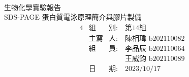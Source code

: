 


\pagestyle{empty}

\begin{center}
~\\
\vspace{2.7cm}
{\fontsize{36}{120}\selectfont 生物化學實驗報告}\\
\vspace{2.2cm}
{\fontsize{36}{80}\selectfont SDS-PAGE 蛋白質電泳原理簡介與膠片製備}
\vspace{2cm}
{\fontsize{18}{20}\selectfont 
  \begin{alignat*}{4}
    &\text{組}&\text{別}:\ &\text{第14組}\\
    &\text{主寫}&\text{人}:\ &\text{陳相瑋 b202110082}\\
    &\text{組}&\text{員}:\ &\text{李品辰 b202110064}\\
         &&&\text{王威鈞 b202110089}\\
    &\text{日}&\text{期}:\ &\text{2023/10/17}\\
  \end{alignat*}    
}


\end{center}
\newpage
